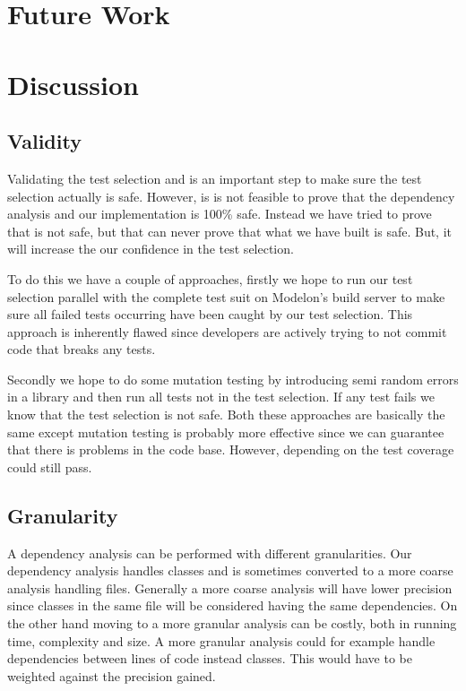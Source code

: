 \documentclass{cslthse-msc}
\begin{document}
\chapter[Future Work]{Future Work}
	
\chapter[Discussion]{Discussion}

\section{Validity}
Validating the test selection and is an important step to make sure the test selection actually is safe. 
However, is is not feasible to prove that the dependency analysis and our implementation is 100\% safe. Instead we have tried to prove that is not safe, but that can never prove that what we have built is safe. But, it will increase the our confidence in the test selection. 

To do this we have a couple of approaches, firstly we hope to run our test selection parallel with the complete test suit on Modelon's build server to make sure all failed tests occurring have been caught by our test selection. This approach is inherently flawed since developers are actively trying to not commit code that breaks any tests. %


Secondly we hope to do some mutation testing by introducing semi random errors in a library and then run all tests not in the test selection. If any test fails we know that the test selection is not safe. Both these approaches are basically the same except mutation testing is probably more effective since we can guarantee that there is problems in the code base. However, depending on the test coverage could still pass. 


\section{Granularity}
A dependency analysis can be performed with different granularities. Our dependency analysis handles classes and is sometimes converted to a more coarse analysis handling files. Generally a more coarse analysis will have lower precision since classes in the same file will be considered having the same dependencies. On the other hand moving to a more granular analysis can be costly, both in running time, complexity and size. A more granular analysis could for example handle dependencies between lines of code instead classes. This would have to be weighted against the precision gained.
\end{document}
